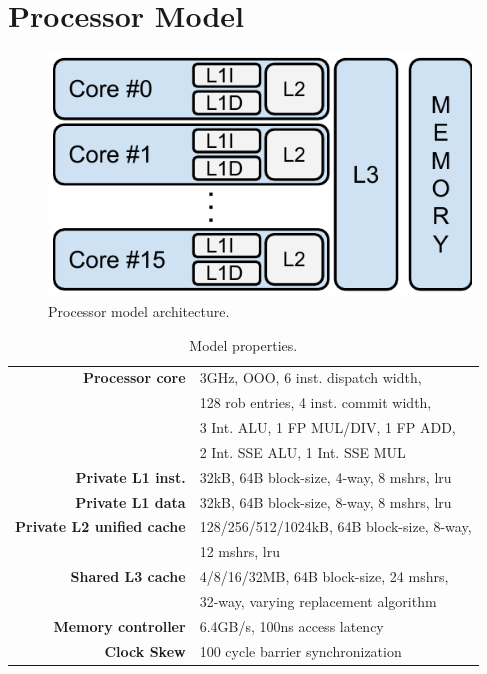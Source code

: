 \section{Processor Model}
\label{sec:methodology:processor_model}

\begin{figure}[ht]
\centering
\includegraphics[scale=.65]{figures/processor_model/processor_model}
\caption{Processor model architecture.}
\label{fig:processor_model}
\end{figure}

\begin{table}[ht]
\centering
\begin{tabular}{rl}
\toprule
\bf{Processor core}                 & 3GHz, OOO, 6 inst. dispatch width,     \\
                                    & 128 rob entries, 4 inst. commit width, \\
                                    & 3 Int. ALU, 1 FP MUL/DIV, 1 FP ADD, \\
                                    & 2 Int. SSE ALU, 1 Int. SSE MUL \\
\bf{Private L1 inst.}               & 32kB, 64B block-size, 4-way, 8 \glspl{mshr}, \gls{lru} \\
\bf{Private L1 data}                & 32kB, 64B block-size, 8-way, 8 \glspl{mshr}, \gls{lru} \\
\bf{Private L2 unified cache}       & 128/256/512/1024kB, 64B block-size, 8-way, \\
                                    & 12 \glspl{mshr}, \gls{lru}      \\
\bf{Shared L3 cache}                & 4/8/16/32MB, 64B block-size, 24 \glspl{mshr}, \\
                                    & 32-way, varying replacement algorithm         \\
\bf{Memory controller}              & 6.4GB/s, 100ns access latency         \\
\bf{Clock Skew}                     & 100 cycle barrier synchronization        \\
\bottomrule                             
\end{tabular}
\caption{Model properties.}
\label{tbl:processor_model:properties}
\end{table}

